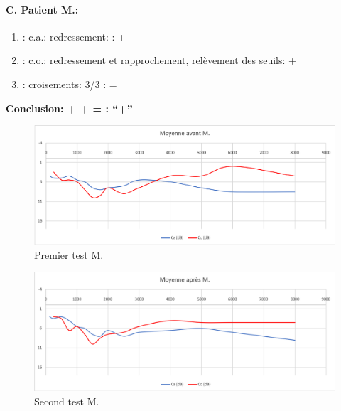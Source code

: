                \paragraph{ C. Patient M.:}


	\begin{enumerate}

 		\item : c.a.: redressement: : +   %

 		\item : c.o.: redressement et rapprochement,
                  relèvement des seuils:  +     %
 		\item : croisements: 3/3 :  =

                \end{enumerate}

                \textbf{  Conclusion:  +  +  =     : ``+''}

                \begin{figure}[th]
\centering
\includegraphics[width=1\linewidth]{images/graphiques/m_pre.png}
\caption[Moyenne OG+OD]{Premier test M.}

\end{figure}


                        \begin{figure}[th]
\centering
\includegraphics[width=1\linewidth]{images/graphiques/m_post.png}
\caption[Moyenne OG+OD]{Second test M.}

\end{figure}




